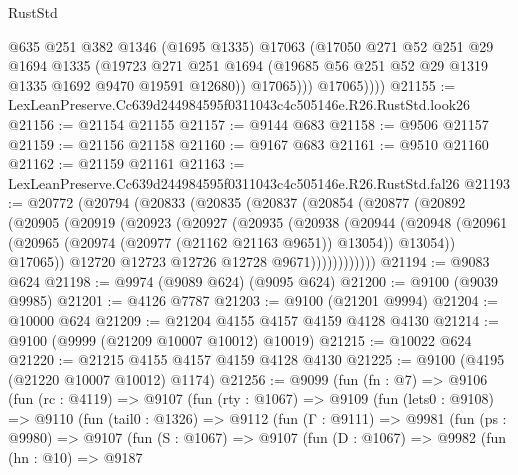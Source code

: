 \begin{lexlean}{RustStd}
\begin{coremodule}
                @635
                @251
                @382
                @1346
                (@1695 @1335)
                @17063
                (@17050
                  @271
                  @52
                  @251
                  @29
                  @1694
                  @1335
                  (@19723
                    @271
                    @251
                    @1694
                    (@19685 @56 @251 @52 @29 @1319 @1335 @1692 @9470 @19591 @12680))
                  @17065)))
            @17065))))
@21155 := LexLeanPreserve.Cc639d244984595f0311043c4c505146e.R26.RustStd.look26
@21156 := @21154 @21155
@21157 := @9144 @683
@21158 := @9506 @21157
@21159 := @21156 @21158
@21160 := @9167 @683
@21161 := @9510 @21160
@21162 := @21159 @21161
@21163 := LexLeanPreserve.Cc639d244984595f0311043c4c505146e.R26.RustStd.fal26
@21193 := @20772
    (@20794
      (@20833
        (@20835
          (@20837
            (@20854
              (@20877
                (@20892
                  (@20905
                    (@20919
                      (@20923
                        (@20927
                          (@20935
                            (@20938
                              (@20944
                                (@20948
                                  (@20961
                                    (@20965 (@20974 (@20977 (@21162 @21163 @9651)) @13054))
                                    @13054))
                                @17065))
                            @12720
                            @12723
                            @12726
                            @12728
                            @9671))))))))))))
@21194 := @9083 @624
@21198 := @9974 (@9089 @624) (@9095 @624)
@21200 := @9100 (@9039 @9985)
@21201 := @4126 @7787
@21203 := @9100 (@21201 @9994)
@21204 := @10000 @624
@21209 := @21204 @4155 @4157 @4159 @4128 @4130
@21214 := @9100 (@9999 (@21209 @10007 @10012) @10019)
@21215 := @10022 @624
@21220 := @21215 @4155 @4157 @4159 @4128 @4130
@21225 := @9100 (@4195 (@21220 @10007 @10012) @1174)
@21256 := @9099
    (fun (fn : @7) =>
    @9106
      (fun (rc : @4119) =>
      @9107
        (fun (rty : @1067) =>
        @9109
          (fun (lets0 : @9108) =>
          @9110
            (fun (tail0 : @1326) =>
            @9112
              (fun (Γ : @9111) =>
              @9981
                (fun (ps : @9980) =>
                @9107
                  (fun (S : @1067) =>
                  @9107
                    (fun (D : @1067) =>
                    @9982
                      (fun (hn : @10) =>
                      @9187

\end{coremodule}
\end{lexlean}
